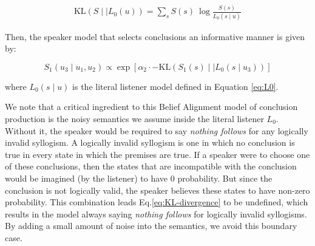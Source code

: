 \documentclass[floatsintext, doc]{apa6}
\begin{document}
\begin{align}
  \label{eq:KL-divergence}
  \text{KL}({S \mid \mid L_0}(u)) = \sum_{s} S(s) \ \log \frac{S(s)}{{L_{0}}(s \mid u)}
\end{align}

\noindent Then, the speaker model that selects conclusions an informative manner is given by: 

\begin{equation}
S_1(u_3 \mid u_1,  u_2) \propto  \exp [ \alpha_2 \cdot - \text{KL}({S_1(s) \mid \mid L_0}(s \mid u_3)) ]  \label{eq:R1b}
\end{equation}

\noindent where $L_0(s \mid u)$ is the literal listener model defined in Equation \ref{eq:L0}. 

We note that a critical ingredient to this Belief Alignment model of conclusion production is the noisy semantics we assume inside the literal listener $L_0$.
Without it, the speaker would be required to say \emph{nothing follows} for any logically invalid syllogism. 
A logically invalid syllogism is one in which no conclusion is true in every state in which the premises are true.
If a speaker were to choose one of these conclusions, then the states that are incompatible with the conclusion would be imagined (by the listener) to have 0 probability. 
But since the conclusion is not logically valid, the speaker believes these states to have non-zero probability.
This combination leads Eq.\ref{eq:KL-divergence} to be undefined, which results in the model always saying \emph{nothing follows} for logically invalid syllogisms.
By adding a small amount of noise into the semantics, we avoid this boundary case.


%
%
%
%

\end{document}
